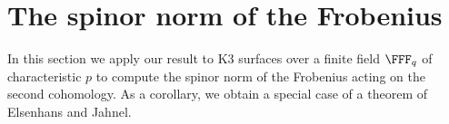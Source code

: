 \section{The spinor norm of the Frobenius}\label{sec:elsenhans_jahnel}

In this section we apply our result to K3 surfaces over a finite field $\FFF_q$ of characteristic $p$ to compute the spinor norm of the Frobenius acting on the second cohomology. As a corollary, we obtain a special case of a theorem of Elsenhans and Jahnel. 

